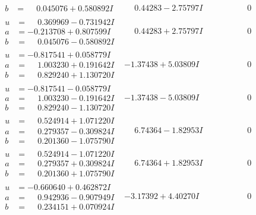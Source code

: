 \documentclass[1p]{elsarticle_modified}
\theoremstyle{definition}
\begin{document}
$$\begin{array}{c|c|c}
\begin{aligned}
b &= \phantom{-}0.045076 + 0.580892 I\end{aligned}
 & \phantom{-}0.44283 - 2.75797 I & \phantom{-0.000000 } 0 \\ \hline\begin{aligned}
u &= \phantom{-}0.369969 - 0.731942 I \\
a &= -0.213708 + 0.807599 I \\
b &= \phantom{-}0.045076 - 0.580892 I\end{aligned}
 & \phantom{-}0.44283 + 2.75797 I & \phantom{-0.000000 } 0 \\ \hline\begin{aligned}
u &= -0.817541 + 0.058779 I \\
a &= \phantom{-}1.003230 + 0.191642 I \\
b &= \phantom{-}0.829240 + 1.130720 I\end{aligned}
 & -1.37438 + 5.03809 I & \phantom{-0.000000 } 0 \\ \hline\begin{aligned}
u &= -0.817541 - 0.058779 I \\
a &= \phantom{-}1.003230 - 0.191642 I \\
b &= \phantom{-}0.829240 - 1.130720 I\end{aligned}
 & -1.37438 - 5.03809 I & \phantom{-0.000000 } 0 \\ \hline\begin{aligned}
u &= \phantom{-}0.524914 + 1.071220 I \\
a &= \phantom{-}0.279357 - 0.309824 I \\
b &= \phantom{-}0.201360 - 1.075790 I\end{aligned}
 & \phantom{-}6.74364 - 1.82953 I & \phantom{-0.000000 } 0 \\ \hline\begin{aligned}
u &= \phantom{-}0.524914 - 1.071220 I \\
a &= \phantom{-}0.279357 + 0.309824 I \\
b &= \phantom{-}0.201360 + 1.075790 I\end{aligned}
 & \phantom{-}6.74364 + 1.82953 I & \phantom{-0.000000 } 0 \\ \hline\begin{aligned}
u &= -0.660640 + 0.462872 I \\
a &= \phantom{-}0.942936 - 0.907949 I \\
b &= \phantom{-}0.234151 + 0.070924 I\end{aligned}
 & -3.17392 + 4.40270 I & \phantom{-0.000000 } 0 \\ \hline\begin{aligned}

\end{aligned}
\end{array}$$
\end{document}
